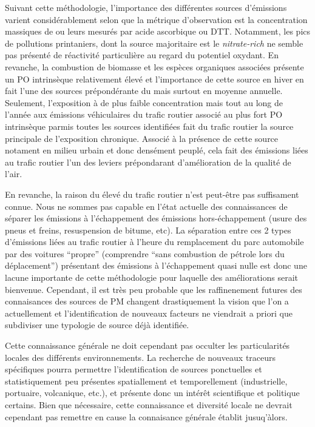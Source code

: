 Suivant cette méthodologie, l'importance des différentes sources d'émissions varient
considérablement selon que la métrique d'observation est la concentration massiques de
\PMdix{} ou leurs \POv{} mesurés par acide ascorbique ou DTT. Notamment, les pics de
pollutions printaniers, dont la source majoritaire est le \textit{nitrate-rich} ne semble
pas présenté de réactivité particulière au regard du potentiel oxydant. En revanche, la
combustion de biomasse et les espèces organiques associées présente un PO intrinsèque
relativement élevé et l'importance de cette source en hiver en fait l'une des sources
prépondérante du \PODTTv{} mais surtout \POAAv{} en moyenne annuelle.
Seulement, l'exposition à de plus faible concentration mais tout au long de l'année aux
émissions véhiculaires du trafic routier associé au plus fort PO intrinsèque parmis toutes
les sources identifiées fait du trafic routier la source principale de l'exposition
chronique. Associé à la présence de cette source notament en milieu urbain et donc
densément peuplé, cela fait des émissions liées au trafic routier l'un des leviers
prépondarant d'amélioration de la qualité de l'air.

En revanche, la raison du \POv{} élevé du trafic routier n'est peut-être pas suffisament
connue.
Nous ne sommes pas capable en l'état actuelle des connaissances de séparer les émissions à
l'échappement des émissions hors-échappement (usure des pneus et freins, resuspension de
bitume, etc). 
La séparation entre ces 2 types d'émissions liées au trafic routier à l'heure du
remplacement du parc automobile par des voitures ``propre'' (comprendre ``sans combustion
de pétrole lors du déplacement'') présentant des émissions à l'échappement quasi nulle
est donc une lacune importante de cette méthodologie pour laquelle des améliorations
serait bienvenue.
Cependant, il est très peu probable que les raffinenement futures des connaisances des sources de
PM changent drastiquement la vision que l'on a actuellement et l'identification de nouveaux
facteurs ne viendrait a priori que subdiviser une typologie de source déjà identifiée.

Cette connaissance générale ne doit cependant pas occulter les particularités locales des
différents environnements.
La recherche de nouveaux traceurs spécifiques pourra permettre l'identification de sources
ponctuelles et statistiquement peu présentes spatiallement et temporellement
(industrielle, portuaire, volcanique, etc.), et présente donc un intérêt scientifique et
politique certains.
Bien que nécessaire, cette connaissance et diversité locale ne devrait cependant pas
remettre en cause la connaisance générale établit jusuq'àlors.

